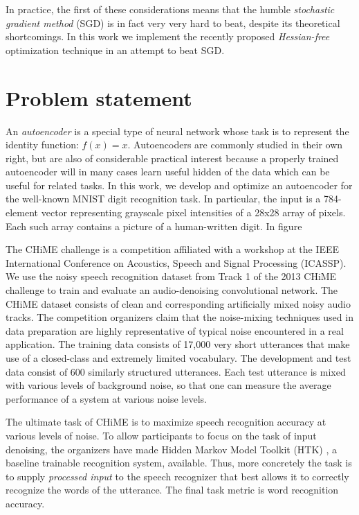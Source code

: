 \documentclass[11pt]{article}
\begin{document}
In practice, the first of these considerations means that the humble \textit{stochastic gradient method} (SGD) is in fact very very hard to beat, despite its theoretical shortcomings. In this work we implement the recently proposed \textit{Hessian-free} optimization technique in an attempt to beat SGD. 


\section{Problem statement}

An \textit{autoencoder} is a special type of neural network whose task is to represent the identity function: $f(x)=x$. Autoencoders are commonly studied in their own right, but are also of considerable practical interest because a properly trained autoencoder will in many cases learn useful hidden  of the data which can be useful for related tasks. In this work, we develop and optimize an autoencoder for the well-known MNIST digit recognition task. In particular, the input is a 784-element vector representing grayscale pixel intensities of a 28x28 array of pixels. Each such array contains a picture of a human-written digit. In figure 

\begin{comment}
Describe your problem precisely specifying the dataset to be used, expected results and evaluation
\end{comment}

The CHiME challenge \cite{inriachime} is a competition affiliated with a workshop at the IEEE International Conference on Acoustics, Speech and Signal Processing (ICASSP).
We use the noisy speech recognition dataset from Track 1 of the 2013 CHiME challenge to train and evaluate an audio-denoising convolutional network.
The CHiME dataset consists of clean and corresponding artificially mixed noisy audio tracks. The competition organizers claim that the noise-mixing techniques used in data preparation are highly representative of typical noise encountered in a real application. The training data consists of 17,000 very short utterances that make use of a closed-class and extremely limited vocabulary. The development and test data consist of 600 similarly structured utterances. Each test utterance is mixed with various levels of background noise, so that one can measure the average performance of a system at various noise levels.

The ultimate task of CHiME is to maximize speech recognition accuracy at various levels of noise. To allow participants to focus on the task of input denoising, the organizers have made Hidden Markov Model Toolkit (HTK) \cite{htk}, a baseline trainable recognition system, available. Thus, more concretely the task is to supply \textit{processed input} to the speech recognizer that best allows it to correctly recognize the words of the utterance. The final task metric is word recognition accuracy. 
\end{document}
